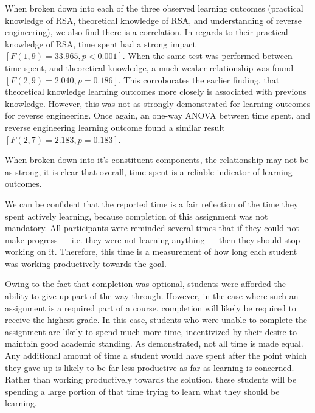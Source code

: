         When broken down into each of the three observed learning outcomes (practical knowledge of RSA, theoretical knowledge of RSA, and understanding of reverse engineering), we also find there is a correlation. %
In regards to their practical knowledge of RSA, time spent had a strong impact $[F(1,9)=33.965, p<0.001]$. %
When the same test was performed between time spent, and theoretical knowledge, a much weaker relationship was found $[F(2, 9)=2.040, p=0.186]$. %
This corroborates the earlier finding, that theoretical knowledge learning outcomes more closely is associated with previous knowledge. %
However, this was not as strongly demonstrated for learning outcomes for reverse engineering. %
Once again, an one-way ANOVA between time spent, and reverse engineering learning outcome found a similar result $[F(2, 7)=2.183, p=0.183]$. 

        When broken down into it's constituent components, the relationship may not be as strong, it is clear that overall, time spent is a reliable indicator of learning outcomes.

        We can be confident that the reported time is a fair reflection of the time they spent actively learning, because completion of this assignment was not mandatory. %
All participants were reminded several times that if they could not make progress ---%
 i.e. %
they were not learning anything ---%
 then they should stop working on it. %
Therefore, this time is a measurement of how long each student was working productively towards the goal. 

        Owing to the fact that completion was optional, students were afforded the ability to give up part of the way through. %
However, in the case where such an assignment is a required part of a course, completion will likely be required to receive the highest grade. %
In this case, students who were unable to complete the assignment are likely to spend much more time, incentivized by their desire to maintain good academic standing. %
As \citeauthor{Z-Zeng} demonstrated, not all time is made equal. Any additional amount of time a student would have spent after the point which they gave up is likely to be far less productive as far as learning is concerned. %
Rather than working productively towards the solution, these students will be spending a large portion of that time trying to learn what they should be learning.

                                

